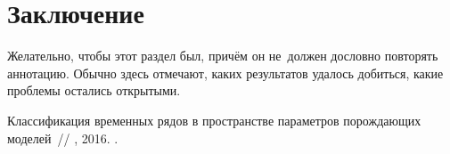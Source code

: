 \documentclass[12pt, twoside]{article}
\begin{document}
\section{Заключение}
Желательно, чтобы этот раздел был, причём он не~должен дословно повторять аннотацию.
Обычно здесь отмечают, каких результатов удалось добиться, какие проблемы остались открытыми.

\begin{thebibliography}{99}

    Классификация временных рядов в пространстве параметров порождающих моделей~//
    , 2016.
	.
 	
\end{thebibliography}
\end{document}
